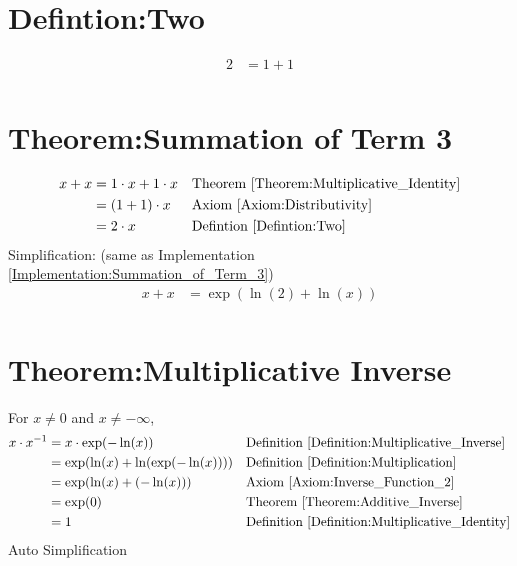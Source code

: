 \documentclass[12pt,a4paper]{report}
\begin{document}
\section{Defintion:Two}
\label{Defintion:Two}
\begin{align*}
2 &= 1+1 \\
\end{align*}

\section{Theorem:Summation of Term 3}
\label{Theorem:Summation_of_Term_3}
\begin{align*}
x + x
&= 1 \cdot x + 1 \cdot x
&& \text{Theorem \ref{Theorem:Multiplicative_Identity}} \\
&= (1+1) \cdot x
&& \text{Axiom \ref{Axiom:Distributivity}} \\
&= 2 \cdot x
&& \text{Defintion \ref{Defintion:Two}} \\
\end{align*}
Simplification: (same as Implementation \ref{Implementation:Summation_of_Term_3})
\begin{align*}
x + x &= \exp(\ln(2) + \ln(x)) \\
\end{align*}

\section{Theorem:Multiplicative Inverse}
\label{Theorem:Multiplicative_Inverse}
For $x \neq 0$ and $x \neq -\infty$,
\begin{align*}
x \cdot x^{-1}
&= x \cdot \exp(-\ln(x))
&& \text{Definition \ref{Definition:Multiplicative_Inverse}} \\
&= \exp( \ln(x) + \ln(\exp(-\ln(x))) )
&& \text{Definition \ref{Definition:Multiplication}} \\
&= \exp( \ln(x) + (-\ln(x)) )
&& \text{Axiom \ref{Axiom:Inverse_Function_2}} \\
&= \exp(0)
&& \text{Theorem \ref{Theorem:Additive_Inverse}} \\
&= 1
&& \text{Definition \ref{Definition:Multiplicative_Identity}} \\
\end{align*}
Auto Simplification
\end{document}
